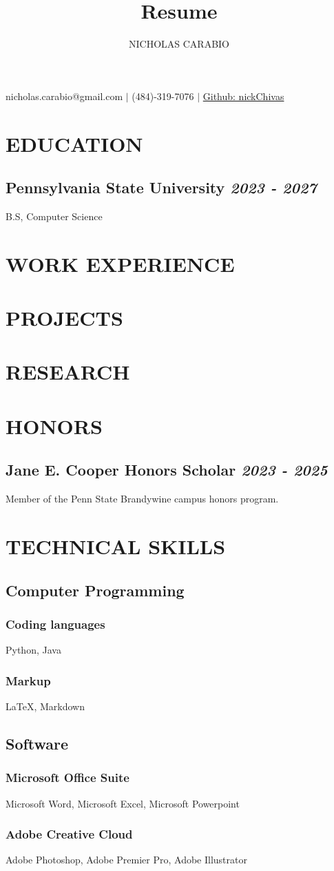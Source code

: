 \documentclass{article}
\makeatletter
\renewcommand{\maketitle}{
\begin{center}
{\huge\bfseries\theauthor}

\vspace{.25em}

nicholas.carabio@gmail.com $|$ (484)-319-7076 $|$ \href{https://github.com/nickChivas}{Github: nickChivas}
\end{center}
}
\makeatother
\begin{document}
\title{Resume}
\author{NICHOLAS CARABIO}

\maketitle

\section{EDUCATION}

\subsection{Pennsylvania State University \hfill \emph{2023 - 2027}}
B.S, Computer Science

\section{WORK EXPERIENCE}

\section{PROJECTS}

\section{RESEARCH}

\section{HONORS}
\subsection{Jane E. Cooper Honors Scholar \hfill \emph{2023 - 2025}}
Member of the Penn State Brandywine campus honors program.

\section{TECHNICAL SKILLS}  
\subsection{Computer Programming}
\subsubsection{Coding languages}
Python, Java

\subsubsection{Markup}
\LaTeX , Markdown
\\
\subsection{Software}
\subsubsection{Microsoft Office Suite}
Microsoft Word, Microsoft Excel, Microsoft Powerpoint

\subsubsection{Adobe Creative Cloud}
Adobe Photoshop, Adobe Premier Pro, Adobe Illustrator
\end{document}
